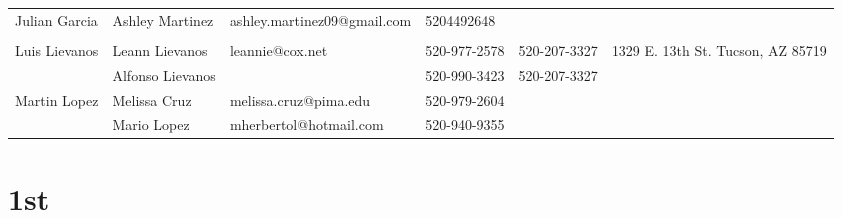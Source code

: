 \documentclass[landscape]{article}\usepackage[]{graphicx}\usepackage[]{color}
\begin{document}
\begin{longtable}{|p{100pt}|p{100pt}|p{140pt}|p{60pt}|p{64pt}|p{120pt}|}
\hline
\multirow{2}{100pt}{Julian Garcia} & Ashley Martinez & ashley.martinez09@gmail.com & 5204492648 &  & \multirow{2}{120pt}{} \\
 &  &  &  &  & \\
\hline
\multirow{2}{100pt}{Luis Lievanos} & Leann Lievanos & leannie@cox.net & 520-977-2578 & 520-207-3327 & \multirow{2}{120pt}{1329 E. 13th St. Tucson, AZ 85719} \\
 & Alfonso Lievanos &  & 520-990-3423 & 520-207-3327 & \\
\hline
\multirow{2}{100pt}{Martin Lopez} & Melissa Cruz & melissa.cruz@pima.edu & 520-979-2604 &  & \multirow{2}{120pt}{} \\
 & Mario Lopez & mherbertol@hotmail.com & 520-940-9355 &  & \\
\hline
\end{longtable}
\newpage
\section{1st}
\end{document}
